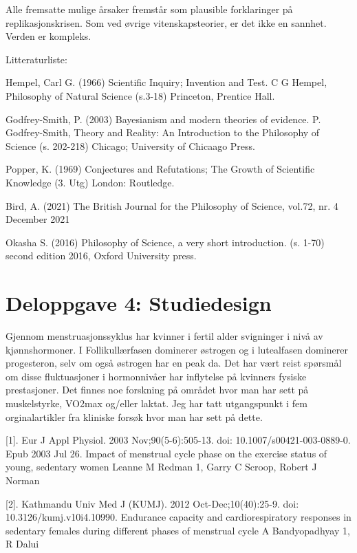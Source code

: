 \documentclass[
  letterpaper,
  DIV=11,
  numbers=noendperiod]{scrreprt}
\begin{document}
Alle fremsatte mulige årsaker fremstår som plausible forklaringer på
replikasjonskrisen. Som ved øvrige vitenskapsteorier, er det ikke en
sannhet. Verden er kompleks.

Litteraturliste:

Hempel, Carl G. (1966) Scientific Inquiry; Invention and Test.
\textbar{} C G Hempel, Philosophy of Natural Science (s.3-18) Princeton,
Prentice Hall.

Godfrey-Smith, P. (2003) Bayesianism and modern theories of evidence.
\textbar{} P. Godfrey-Smith, Theory and Reality: An Introduction to the
Philosophy of Science (s. 202-218) Chicago; University of Chicaago
Press.

Popper, K. (1969) Conjectures and Refutations; The Growth of Scientific
Knowledge (3. Utg) London: Routledge.

Bird, A. (2021) The British Journal for the Philosophy of Science,
vol.72, nr. 4 December 2021

Okasha S. (2016) Philosophy of Science, a very short introduction. (s.
1-70) second edition 2016, Oxford University press.


\hypertarget{deloppgave-4-studiedesign}{%
\chapter{Deloppgave 4: Studiedesign}\label{deloppgave-4-studiedesign}}

Gjennom menstruasjonssyklus har kvinner i fertil alder svigninger i nivå
av kjønnshormoner. I Follikullærfasen dominerer østrogen og i
lutealfasen dominerer progesteron, selv om også østrogen har en peak da.
Det har vært reist spørsmål om disse fluktuasjoner i hormonnivåer har
inflytelse på kvinners fysiske prestasjoner. Det finnes noe forskning på
området hvor man har sett på muskelstyrke, VO2max og/eller laktat. Jeg
har tatt utgangspunkt i fem orginalartikler fra kliniske forsøk hvor man
har sett på dette.

{[}1{]}. Eur J Appl Physiol. 2003 Nov;90(5-6):505-13. doi:
10.1007/s00421-003-0889-0. Epub 2003 Jul 26. Impact of menstrual cycle
phase on the exercise status of young, sedentary women Leanne M Redman
1, Garry C Scroop, Robert J Norman

{[}2{]}. Kathmandu Univ Med J (KUMJ). 2012 Oct-Dec;10(40):25-9. doi:
10.3126/kumj.v10i4.10990. Endurance capacity and cardiorespiratory
responses in sedentary females during different phases of menstrual
cycle A Bandyopadhyay 1, R Dalui
\end{document}
